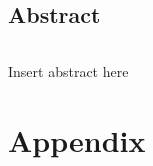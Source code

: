 \documentclass[fontsize=12pt,twoside=semi,openright,numbers=noenddot,parskip=half]{scrbook}
\begin{document}
\chapter{Abstract}
\paragraph{}Insert abstract here
\mainmatter\tableofcontents

%
%
%
%
%
\backmatter{}\setcounter{page}{0}
\cleardoublepage\part{Appendix}\appendix
%
\clearpage
\printbibliography[title={References}]
\end{document}
